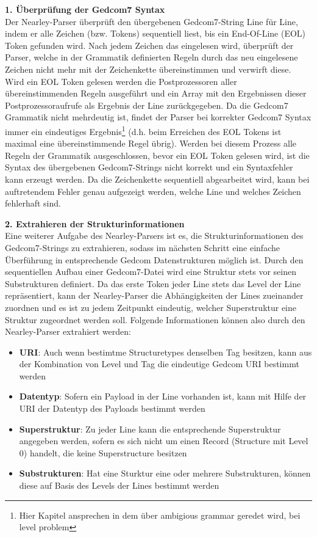 \vspace{1em}
\textbf{1. Überprüfung der Gedcom7 Syntax} \vspace{0.5em} \\
Der Nearley-Parser überprüft den übergebenen Gedcom7-String Line für Line, indem er alle Zeichen (bzw. Tokens) sequentiell liest, bis ein End-Of-Line (EOL) Token  gefunden wird. Nach jedem Zeichen das eingelesen wird, überprüft der Parser, welche in der Grammatik definierten Regeln durch das neu eingelesene Zeichen nicht mehr mit der Zeichenkette übereinstimmen und verwirft diese. Wird ein EOL Token gelesen werden die Postprozessoren aller übereinstimmenden Regeln ausgeführt und ein Array mit den Ergebnissen dieser Postprozessoraufrufe als Ergebnis der Line zurückgegeben. Da die Gedcom7 Grammatik nicht mehrdeutig ist, findet der Parser bei korrekter Gedcom7 Syntax immer ein eindeutiges Ergebnis\footnote{Hier Kapitel ansprechen in dem über ambigious grammar geredet wird, bei level problem} (d.h. beim Erreichen des EOL Tokens ist maximal eine übereinstimmende Regel übrig). Werden bei diesem Prozess alle Regeln der Grammatik ausgeschlossen, bevor ein EOL Token gelesen wird, ist die Syntax des übergebenen Gedcom7-Strings nicht korrekt und ein Syntaxfehler kann erzeugt werden. Da die Zeichenkette sequentiell abgearbeitet wird, kann bei auftretendem Fehler genau aufgezeigt werden, welche Line und welches Zeichen fehlerhaft sind.

\vspace{1em}
\textbf{2. Extrahieren der Strukturinformationen} \vspace{0.5em} \\
Eine weiterer Aufgabe des Nearley-Parsers ist es, die Strukturinformationen des Gedcom7-Strings zu extrahieren, sodass im nächsten Schritt eine einfache Überführung in entsprechende Gedcom Datenstrukturen möglich ist. Durch den sequentiellen Aufbau einer Gedcom7-Datei wird eine Struktur stets vor seinen Substrukturen definiert. Da das erste Token jeder Line stets das Level der Line repräsentiert, kann der Nearley-Parser die Abhängigkeiten der Lines zueinander zuordnen und es ist zu jedem Zeitpunkt eindeutig, welcher Superstruktur eine Struktur zugeordnet werden soll. Folgende Informationen können also durch den Nearley-Parser extrahiert werden: 
\begin{itemize}
	\item \textbf{URI}: Auch wenn bestimtme Structuretypes denselben Tag besitzen, kann aus der Kombination von Level und Tag die eindeutige Gedcom URI bestimmt werden
	\item \textbf{Datentyp}: Sofern ein Payload in der Line vorhanden ist, kann mit Hilfe der URI der Datentyp des Payloads bestimmt werden
	\item \textbf{Superstruktur}: Zu jeder Line kann die entsprechende Superstruktur angegeben werden, sofern es sich nicht um einen Record (Structure mit Level 0) handelt, die keine Superstructure besitzen
	\item \textbf{Substrukturen}: Hat eine Sturktur eine oder mehrere Substrukturen, können diese auf Basis des Levels der Lines bestimmt werden
\end{itemize}

